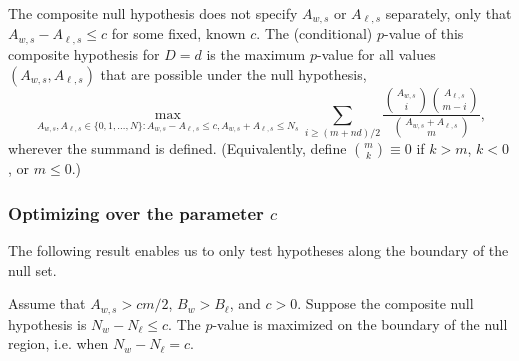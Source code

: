 The composite null hypothesis does not specify $A_{w,s}$ or $A_{\ell,s}$ separately, only 
that $A_{w,s} - A_{\ell,s} \le c$ for
some fixed, known $c$.
The (conditional) $p$-value of this composite hypothesis for $D=d$ is the maximum $p$-value for all
values $(A_{w,s}, A_{\ell,s})$ that are possible under the null hypothesis,
\begin{equation}
  \max_{A_{w,s}, A_{\ell,s} \in \{0, 1, \ldots, N \}: A_{w,s} - A_{\ell,s} \le c, A_{w,s} + A_{\ell,s} \le N_s}
   \sum_{i \geq (m+nd)/2} \frac{ {A_{w,s} \choose i}{A_{\ell,s} \choose m-i} }{{A_{w,s} + A_{\ell, s} \choose m}},
\end{equation}
wherever the summand is defined. 
(Equivalently, define ${m \choose k} \equiv 0$ if $k > m$, $k < 0$, or $m \le 0$.)

\subsubsection{Optimizing over the parameter $c$}
The following result enables us to only test hypotheses along the boundary of the null set.

\begin{thm}
Assume that $A_{w,s} > cm/2$, $B_w > B_\ell$, and $c>0$.
Suppose the composite null hypothesis is $N_w - N_\ell \leq c$.
The $p$-value is maximized on the boundary of the null region, i.e. when $N_w - N_\ell = c$.
\end{thm}


